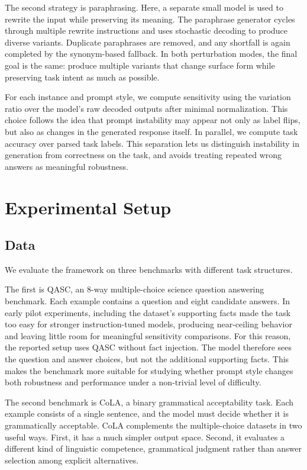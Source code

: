 \documentclass[11pt]{article}
\begin{document}
The second strategy is paraphrasing. Here, a separate small model is used to rewrite the input while preserving its meaning. The paraphrase generator cycles through multiple rewrite instructions and uses stochastic decoding to produce diverse variants. Duplicate paraphrases are removed, and any shortfall is again completed by the synonym-based fallback. In both perturbation modes, the final goal is the same: produce multiple variants that change surface form while preserving task intent as much as possible.

For each instance and prompt style, we compute sensitivity using the variation ratio over the model's raw decoded outputs after minimal normalization. This choice follows the idea that prompt instability may appear not only as label flips, but also as changes in the generated response itself. In parallel, we compute task accuracy over parsed task labels. This separation lets us distinguish instability in generation from correctness on the task, and avoids treating repeated wrong answers as meaningful robustness.

\section{Experimental Setup}

\subsection{Data}

We evaluate the framework on three benchmarks with different task structures.

The first is QASC, an 8-way multiple-choice science question answering benchmark. Each example contains a question and eight candidate answers. In early pilot experiments, including the dataset's supporting facts made the task too easy for stronger instruction-tuned models, producing near-ceiling behavior and leaving little room for meaningful sensitivity comparisons. For this reason, the reported setup uses QASC without fact injection. The model therefore sees the question and answer choices, but not the additional supporting facts. This makes the benchmark more suitable for studying whether prompt style changes both robustness and performance under a non-trivial level of difficulty.

The second benchmark is CoLA, a binary grammatical acceptability task. Each example consists of a single sentence, and the model must decide whether it is grammatically acceptable. CoLA complements the multiple-choice datasets in two useful ways. First, it has a much simpler output space. Second, it evaluates a different kind of linguistic competence, grammatical judgment rather than answer selection among explicit alternatives.
\end{document}
